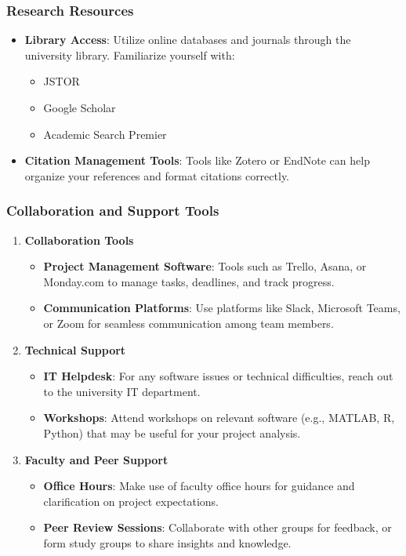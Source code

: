 \documentclass[aspectratio=169]{beamer}
\begin{document}
\begin{frame}[fragile]
  \frametitle{Research Resources}
  \begin{itemize}
    \item \textbf{Library Access}: Utilize online databases and journals through the university library. Familiarize yourself with:
    \begin{itemize}
      \item JSTOR
      \item Google Scholar
      \item Academic Search Premier
    \end{itemize}
    \item \textbf{Citation Management Tools}: Tools like Zotero or EndNote can help organize your references and format citations correctly.
  \end{itemize}
\end{frame}

\begin{frame}[fragile]
  \frametitle{Collaboration and Support Tools}
  \begin{enumerate}
    \item \textbf{Collaboration Tools}
    \begin{itemize}
      \item \textbf{Project Management Software}: Tools such as Trello, Asana, or Monday.com to manage tasks, deadlines, and track progress.
      \item \textbf{Communication Platforms}: Use platforms like Slack, Microsoft Teams, or Zoom for seamless communication among team members.
    \end{itemize}
    
    \item \textbf{Technical Support}
    \begin{itemize}
      \item \textbf{IT Helpdesk}: For any software issues or technical difficulties, reach out to the university IT department.
      \item \textbf{Workshops}: Attend workshops on relevant software (e.g., MATLAB, R, Python) that may be useful for your project analysis.
    \end{itemize}
    
    \item \textbf{Faculty and Peer Support}
    \begin{itemize}
      \item \textbf{Office Hours}: Make use of faculty office hours for guidance and clarification on project expectations.
      \item \textbf{Peer Review Sessions}: Collaborate with other groups for feedback, or form study groups to share insights and knowledge.
    \end{itemize}
  \end{enumerate}
\end{frame}
\end{document}
